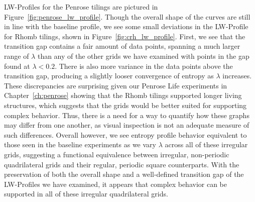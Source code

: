 \documentclass[a4paper,11pt,twoside]{report}
\begin{document}
LW-Profiles for the Penrose tilings are pictured in Figure~\ref{fig:penrose_lw_profile}. Though the overall shape of the curves are still in line with the baseline profile, we see some small deviations in the LW-Profile for Rhomb tilings, shown in Figure~\ref{fig:crh_lw_profile}. First, we see that the transition gap contains a fair amount of data points, spanning a much larger range of $\lambda$ than any of the other grids we have examined with points in the gap found at $\lambda < 0.2$. There is also more variance in the data points above the transition gap, producing a slightly looser convergence of entropy as $\lambda$ increases. These discrepancies are surprising given our Penrose Life experiments in Chapter~\ref{ch:penrose} showing that the Rhomb tilings supported longer living structures, which suggests that the grids would be better suited for supporting complex behavior. Thus, there is a need for a way to quantify how these graphs may differ from one another, as visual inspection is not an adequate measure of such differences. Overall however, we see entropy profile behavior equivalent to those seen in the baseline experiments as we vary $\lambda$ across all of these irregular grids, suggesting a functional equivalence between irregular, non-periodic quadrilateral grids and their regular, periodic square counterparts. With the preservation of both the overall shape and a well-defined transition gap of the LW-Profiles we have examined, it appears that complex behavior can be supported in all of these irregular quadrilateral grids.
\end{document}
